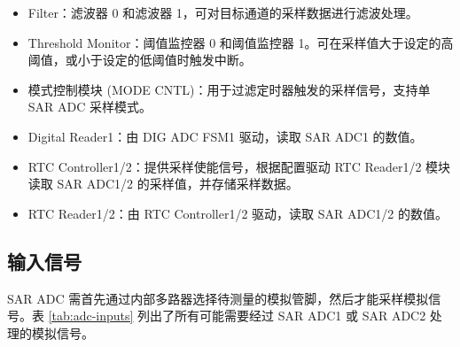 \documentclass[main\_\_CN.tex]{subfiles}
\begin{document}
\begin{itemize}
\begin{itemize}
    \end{itemize}
    \item Filter：滤波器 0 和滤波器 1，可对目标通道的采样数据进行滤波处理。
    \item Threshold Monitor：阈值监控器 0 和阈值监控器 1。可在采样值大于设定的高阈值，或小于设定的低阈值时触发中断。
    \item 模式控制模块 (MODE CNTL)：用于过滤定时器触发的采样信号，支持单 SAR ADC 采样模式。
    \item \label{block:digital-reader0} Digital Reader1：由 DIG ADC FSM1 驱动，读取 SAR ADC1 的数值。
    \item RTC Controller1/2：提供采样使能信号，根据配置驱动 RTC Reader1/2 模块读取 SAR ADC1/2 的采样值，并存储采样数据。
    \item RTC Reader1/2：由 RTC Controller1/2 驱动，读取 SAR ADC1/2 的数值。
\end{itemize}

\subsection{输入信号}

SAR ADC 需首先通过内部多路器选择待测量的模拟管脚，然后才能采样模拟信号。表 \ref{tab:adc-inputs} 列出了所有可能需要经过 SAR ADC1 或 SAR ADC2 处理的模拟信号。
\end{document}
